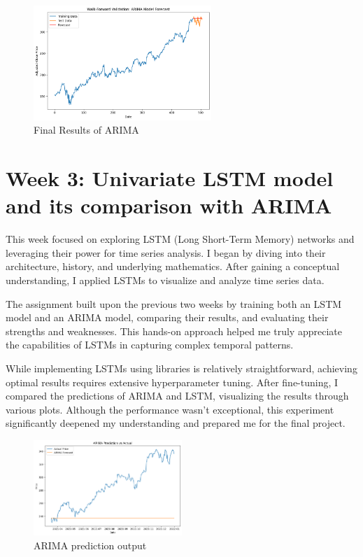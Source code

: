 \documentclass[12pt,a4paper]{article}
\begin{document}
\begin{figure}[!h]
    \centering
    \includegraphics[width=0.6\textwidth]{Week2_final_result.png} %
    \caption{Final Results of ARIMA}
    \label{fig8}
\end{figure}

\section{Week 3: Univariate LSTM model and its comparison with ARIMA}
This week focused on exploring LSTM (Long Short-Term Memory) networks and leveraging their power for time series analysis. I began by diving into their architecture, history, and underlying mathematics. After gaining a conceptual understanding, I applied LSTMs to visualize and analyze time series data.

The assignment built upon the previous two weeks by training both an LSTM model and an ARIMA model, comparing their results, and evaluating their strengths and weaknesses. This hands-on approach helped me truly appreciate the capabilities of LSTMs in capturing complex temporal patterns.

While implementing LSTMs using libraries is relatively straightforward, achieving optimal results requires extensive hyperparameter tuning. After fine-tuning, I compared the predictions of ARIMA and LSTM, visualizing the results through various plots. Although the performance wasn’t exceptional, this experiment significantly deepened my understanding and prepared me for the final project.

\begin{figure}[!h]
    \centering
    \includegraphics[width=0.5\textwidth]{Week3_ARIMA_prediction.png} %
    \caption{ARIMA prediction output}
    \label{fig9}
\end{figure}
\end{document}
